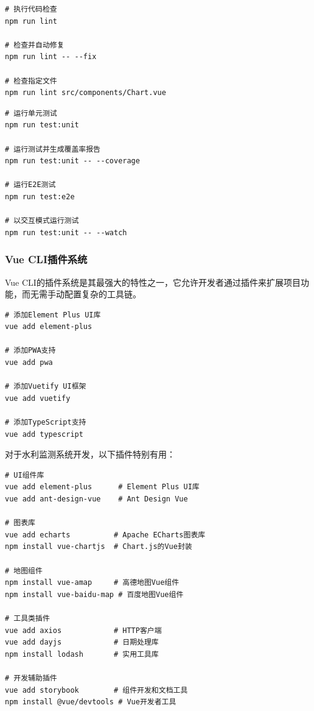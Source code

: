 
\begin{lstlisting}[style=terminal]
# 执行代码检查
npm run lint

# 检查并自动修复
npm run lint -- --fix

# 检查指定文件
npm run lint src/components/Chart.vue
\end{lstlisting}


\begin{lstlisting}[style=terminal]
# 运行单元测试
npm run test:unit

# 运行测试并生成覆盖率报告
npm run test:unit -- --coverage

# 运行E2E测试
npm run test:e2e

# 以交互模式运行测试
npm run test:unit -- --watch
\end{lstlisting}

\hypertarget{vue-cliux63d2ux4ef6ux7cfbux7edf}{%
\subsubsection{Vue CLI插件系统}\label{vue-cliux63d2ux4ef6ux7cfbux7edf}}

Vue CLI的插件系统是其最强大的特性之一，它允许开发者通过插件来扩展项目功能，而无需手动配置复杂的工具链。


\begin{lstlisting}[style=terminal]
# 添加Element Plus UI库
vue add element-plus

# 添加PWA支持
vue add pwa

# 添加Vuetify UI框架
vue add vuetify

# 添加TypeScript支持
vue add typescript
\end{lstlisting}


对于水利监测系统开发，以下插件特别有用：

\begin{lstlisting}[style=terminal]
# UI组件库
vue add element-plus      # Element Plus UI库
vue add ant-design-vue    # Ant Design Vue

# 图表库
vue add echarts          # Apache ECharts图表库
npm install vue-chartjs  # Chart.js的Vue封装

# 地图组件
npm install vue-amap     # 高德地图Vue组件
npm install vue-baidu-map # 百度地图Vue组件

# 工具类插件
vue add axios            # HTTP客户端
vue add dayjs            # 日期处理库
npm install lodash       # 实用工具库

# 开发辅助插件
vue add storybook        # 组件开发和文档工具
npm install @vue/devtools # Vue开发者工具
\end{lstlisting}

